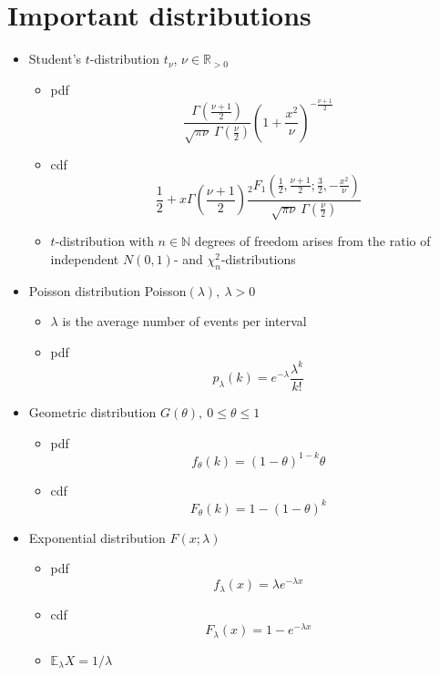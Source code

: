 \documentclass[12pt]{article}
\theoremstyle{definition}
\theoremstyle{remark}
\numberwithin{equation}{section}
\newcommand{\RR}{\mathbb{R}}
\newcommand{\NN}{\mathbb{N}}
\newcommand{\EE}{\mathbb{E}}
\begin{document}
\section{Important distributions}
\begin{itemize}
	\item Student's $t$-distribution $t_\nu$, $\nu\in\RR_{>0}$
	\begin{itemize}
		\item pdf
		\begin{equation}\label{t_pdf}
			\frac{\Gamma(\frac{\nu+1}2)}{\sqrt{\pi\nu}\ \Gamma(\frac\nu2)}\left(1+\frac {x^2}\nu\right)^{-\frac{\nu+1}2}
		\end{equation}
		\item cdf
		\begin{equation}\label{t_cdf}
			\frac 12 +x\Gamma\left(\frac{\nu+1}2\right)\frac{_2F_1\left(\frac 12, \frac {\nu+1}2; \frac 32, -\frac {x^2}\nu\right)}{\sqrt{\pi\nu}\ \Gamma(\frac\nu2)}
		\end{equation}
		\item $t$-distribution with $n\in\NN$ degrees of freedom arises from the ratio of independent $N(0,1)$- and $\chi^2_n$-distributions
	\end{itemize}
	\item Poisson distribution Poisson$(\lambda),\ \lambda > 0$
	\begin{itemize}
		\item $\lambda$ is the average number of events per interval
		\item pdf
		\begin{equation}\label{poisson_pdf}
			p_\lambda(k) = e^{-\lambda}\frac {\lambda^k}{k!}
		\end{equation}
	\end{itemize}


	\item Geometric distribution $G(\theta),\ 0\leq\theta\leq 1$
	\begin{itemize}
		\item pdf
		\begin{equation}\label{geometric_pdf}
			f_\theta(k) = (1-\theta)^{1-k}\theta
		\end{equation}
		\item cdf
		\begin{equation}\label{geometric_cdf}
			F_\theta(k) = 1-(1-\theta)^k
		\end{equation}
	\end{itemize}

	\item Exponential distribution $F(x;\lambda)$
	\begin{itemize}
		\item pdf
		\begin{equation}\label{exponential_pdf}
			f_\lambda(x) = \lambda e^{-\lambda x}
		\end{equation}
		\item cdf
		\begin{equation}\label{exponential_cdf}
			F_\lambda(x) = 1 - e^{-\lambda x}
		\end{equation}
		\item $\EE_\lambda X = 1/\lambda$


\end{itemize}
\end{itemize}
\end{document}
